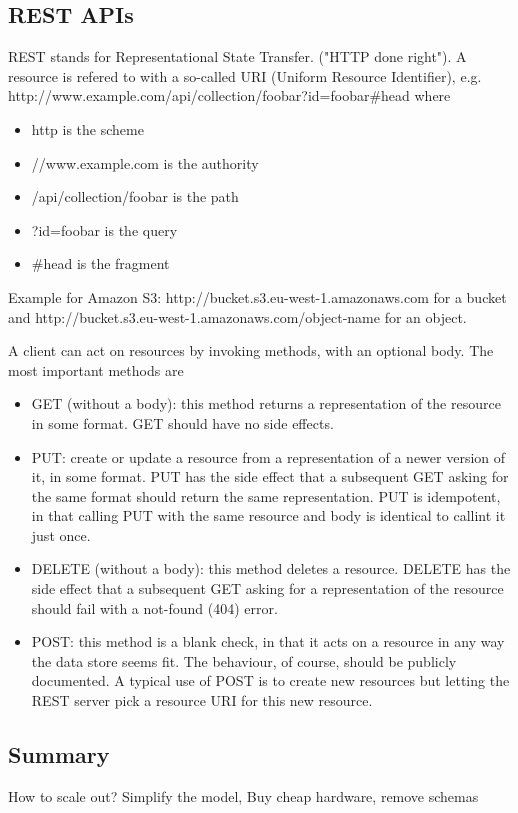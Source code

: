 \subsection{REST APIs}

REST stands for Representational State Transfer. ("HTTP done right"). A resource is refered to with a so-called URI (Uniform Resource Identifier), e.g. http://www.example.com/api/collection/foobar?id=foobar\#head where
\begin{itemize}
    \item http is the scheme
    \item //www.example.com is the authority
    \item /api/collection/foobar is the path
    \item ?id=foobar is the query
    \item \#head is the fragment
\end{itemize}
Example for Amazon S3:
http://bucket.s3.eu-west-1.amazonaws.com for a bucket and http://bucket.s3.eu-west-1.amazonaws.com/object-name for an object.

A client can act on resources by invoking methods, with an optional body. The most important methods are
\begin{itemize}
    \item GET (without a body): this method returns a representation of the resource in some format. GET should have no side effects.
    \item PUT: create or update a resource from a representation of a newer version of it, in some format. PUT has the side effect that a subsequent GET asking for the same format should return the same representation. PUT is idempotent, in that calling PUT with the same resource and body is identical to callint it just once.
    \item DELETE (without a body): this method deletes a resource. DELETE has the side effect that a subsequent GET asking for a representation of the resource should fail with a not-found (404) error.
    \item POST: this method is a blank check, in that it acts on a resource in any way the data store seems fit. The behaviour, of course, should be publicly documented. A typical use of POST is to create new resources but letting the REST server pick a resource URI for this new resource.
\end{itemize}

\subsection{Summary}

How to scale out?
Simplify the model, Buy cheap hardware, remove schemas